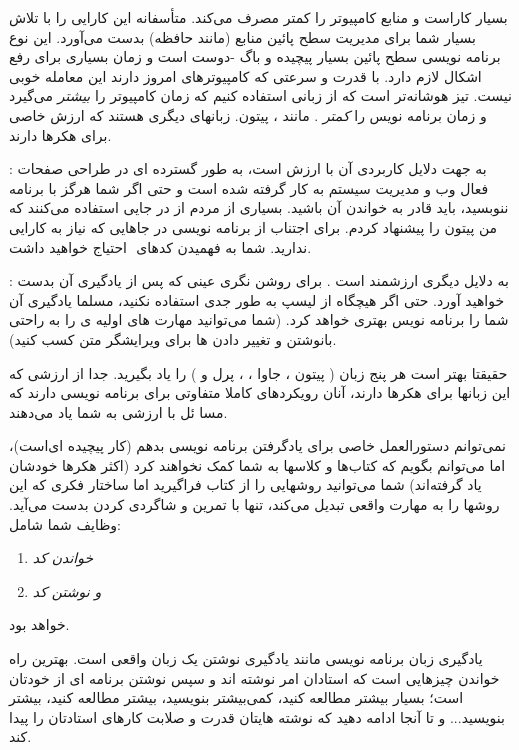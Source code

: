  بسیار کاراست و منابع کامپیوتر را کمتر مصرف می‌کند. متأسفانه  این کارایی را با تلاش بسیار شما برای مدیریت سطح پائین منابع (مانند حافظه) بدست می‌آورد. این نوع برنامه نویسی سطح پائین بسیار پیچیده و باگ -دوست است و زمان بسیاری برای رفع اشکال
 لازم دارد. با قدرت و سرعتی که کامپیوترهای امروز دارند این معامله خوبی نیست. تیز هوشانه‌تر است که از زبانی استفاده کنیم که زمان کامپیوتر را
\emph{بیشتر}
می‌گیرد و زمان برنامه نویس را
\emph{کمتر}
. مانند ، پیتون.
زبانهای دیگری هستند که ارزش خاصی برای هکرها دارند.

:
به جهت دلایل کاربردی آن با ارزش است، به طور گسترده ای در طراحی صفحات فعال وب و مدیریت سیستم به کار گرفته شده است و حتی اگر شما هرگز با
برنامه ننوبسید، باید قادر به خواندن آن باشید. بسیاری از مردم از 
 در جایی استفاده می‌کنند که من پیتون را پیشنهاد کردم. برای اجتناب از برنامه نویسی  در جاهایی که نیاز به کارایی  ندارید. شما به فهمیدن کدهای ‌
 احتیاج خواهید داشت.
 
:
به دلایل دیگری ارزشمند است . برای روشن نگری عینی که پس از یادگیری آن بدست خواهید آورد. حتی اگر هیچگاه از لیسپ به طور جدی استفاده نکنید، مسلما یادگیری آن شما را برنامه نویس بهتری خواهد کرد. (شما می‌توانید مهارت های اولیه ی‌
 را به راحتی بانوشتن و تغییر دادن 
ها برای ویرایشگر متن 
 کسب کنید).
 
حقیقتا بهتر است هر پنج زبان ( پیتون ، جاوا ،
، پرل و 
) را یاد بگیرید. جدا از ارزشی که این زبانها برای هکرها دارند، آنان رویکردهای کاملا متفاوتی برای برنامه نویسی دارند که مسا ئل با ارزشی به شما یاد می‌دهند.

نمی‌توانم دستورالعمل خاصی برای یادگرفتن برنامه نویسی بدهم (کار پیچیده ای‌است)، اما می‌توانم بگویم که کتاب‌ها و کلاسها به شما کمک نخواهند کرد (اکثر هکرها خودشان یاد گرفته‌اند) شما می‌توانید روشهایی را از کتاب فراگیرید اما ساختار فکری که این روشها را به مهارت واقعی تبدیل می‌کند، تنها با تمرین و شاگردی کردن بدست می‌آید. وظایف شما شامل:
\begin{enumerate}
	\item \emph{خواندن کد}
	\item \emph{و نوشتن کد}
\end{enumerate}
خواهد بود.

یادگیری زبان برنامه نویسی مانند یادگیری نوشتن یک زبان واقعی است. بهترین راه خواندن چیزهایی است که استادان امر نوشته اند و سپس نوشتن برنامه ای از خودتان است؛ بسیار بیشتر مطالعه کنید، کمی‌بیشتر بنویسید، بیشتر مطالعه کنید، بیشتر بنویسید... و تا آنجا ادامه دهید که نوشته هایتان قدرت و صلابت کارهای استادتان را پیدا کند.

